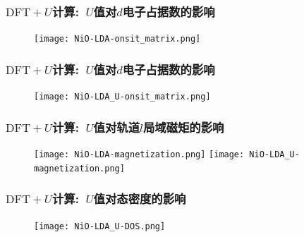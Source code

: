 \frame%
{
	\frametitle{$\mathrm{DFT}+U$计算:~$U$值对$d$电子占据数的影响}
\begin{figure}[h!]
	\vskip -12pt
\centering
\texttt{[image: NiO-LDA-onsit\_matrix.png]}
\caption{\fontsize{6.2pt}{5.2pt}}%
\label{NiO-LDA-onsite_matrix}
\end{figure}
}
\frame%
{
	\frametitle{$\mathrm{DFT}+U$计算:~$U$值对$d$电子占据数的影响}
\begin{figure}[h!]
	\vskip -12pt
\centering
\texttt{[image: NiO-LDA\_U-onsit\_matrix.png]}
\caption{\fontsize{6.2pt}{5.2pt}}%
\label{NiO-LDA_U-onsite_matrix}
\end{figure}
}

\frame%
{
	\frametitle{$\mathrm{DFT}+U$计算:~$U$值对轨道$l$局域磁矩的影响}
\begin{figure}[h!]
\centering
\texttt{[image: NiO-LDA-magnetization.png]}
\texttt{[image: NiO-LDA\_U-magnetization.png]}
\caption{\fontsize{6.2pt}{5.2pt}}%
\label{NiO-LDA_U-magnetization}
\end{figure}
}

\frame%
{
	\frametitle{$\mathrm{DFT}+U$计算:~$U$值对态密度的影响}
\begin{figure}[h!]
\centering
\texttt{[image: NiO-LDA\_U-DOS.png]}
\caption{\fontsize{6.2pt}{5.2pt}}%
\label{NiO-LDA_U-DOS}
\end{figure}
}

